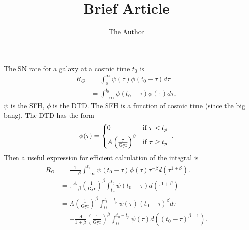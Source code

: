 \documentclass[11pt, oneside]{article}   	%
\title{Brief Article}
\author{The Author}
\begin{document}
\maketitle
The SN rate for a galaxy at a cosmic time $t_0$ is
\begin{align}
R_G &= \int_{0}^{\infty} \psi(\tau) \phi(t_0-\tau) d\tau \\
 &= \int_{-\infty}^{t_0} \psi(t_0-\tau) \phi(\tau) d\tau,
\end{align}
$\psi$ is the SFH, $\phi$ is the DTD. 
The SFH is a function of cosmic time (since the big bang).
The DTD has the form
\begin{equation}
\phi(\tau) =  
\begin{cases*} 
            0  &  if $\tau < t_p$  \\
             A \left(\frac{\tau}{\mathrm{Gyr}} \right)^\beta  & if $\tau \geq t_p$ 
          \end{cases*}.
\end{equation}
Then a useful expression for efficient calculation of the integral is
\begin{align}
R_G &= \frac{1}{1+\beta}  \int_{-\infty}^{t_0} \psi(t_0-\tau)  \phi(\tau)\tau^{-\beta}  d(\tau^{1+\beta}). \\
 &= \frac{A}{1+\beta}  \left(\frac{1}{\mathrm{Gyr}} \right)^\beta \int_{t_p}^{t_0} \psi(t_0-\tau) d(\tau^{1+\beta}) \\
 & = A   \left(\frac{1}{\mathrm{Gyr}} \right)^\beta  \int_{0}^{t_0-t_p} \psi(\tau) (t_0-\tau)^{\beta} d\tau \\
& = - \frac{A}{1+\beta}    \left(\frac{1}{\mathrm{Gyr}} \right)^\beta  \int_{0}^{t_0-t_p} \psi(\tau) d\left((t_0-\tau)^{\beta+1} \right) .
 \end{align}
\end{document}
